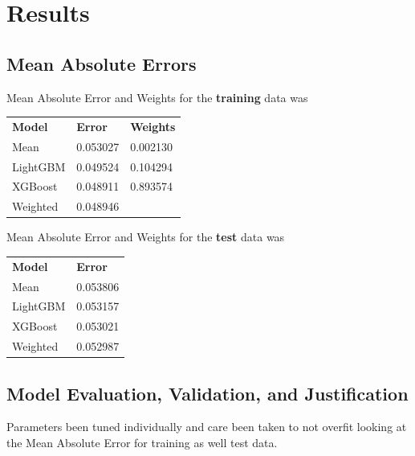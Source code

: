\documentclass[a4paper]{article}
\begin{document}
\section{Results}

\subsection{Mean Absolute Errors}
Mean Absolute Error and Weights for the \textbf{training} data was
\begin{center}
\begin{tabular}{ l l l }
    \textbf{Model} & \textbf{Error} & \textbf{Weights} \\
    Mean & 0.053027 & 0.002130 \\
    LightGBM & 0.049524 & 0.104294 \\
    XGBoost  & 0.048911 & 0.893574 \\
    Weighted & 0.048946 & \\
\end{tabular}
\end{center}

Mean Absolute Error and Weights for the \textbf{test} data was
\begin{center}
\begin{tabular}{ l l }
    \textbf{Model} & \textbf{Error} \\
    Mean & 0.053806  \\
    LightGBM & 0.053157  \\
    XGBoost  & 0.053021  \\
    Weighted & 0.052987  \\
\end{tabular}
\end{center}


\subsection{Model Evaluation, Validation, and Justification}


Parameters been tuned individually and care been taken to not overfit looking at the Mean Absolute Error for
training as well test data.
\end{document}
